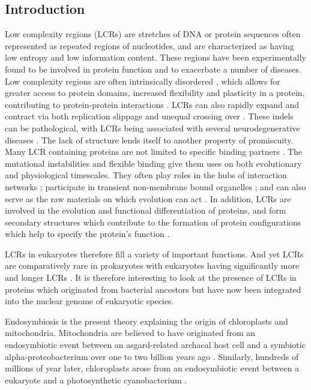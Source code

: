 \documentclass[a4paper,12pt]{article}
\begin{document}
\pagestyle{fancy}
\begin{multicols}{2}
\section*{Introduction}

Low complexity regions (LCRs) are stretches of DNA or protein
sequences often represented as repeated regions of nucleotides, and
are characterized as having low entropy and low information content.
These regions have been experimentally found to be involved in protein
function and to exacerbate a number of diseases. Low complexity regions
are often intrinsically disordered \citep{Rome:01,Dosz:06}, which
allows for greater access to protein domains, increased flexibility
and plasticity in a protein, contributing to protein-protein
interactions \citep{EnrightEtAl2023}.  LCRs can also rapidly expand
and contract via both replication slippage \citep{Hunt:06} and unequal
crossing over \citep{DePr:06}. These indels can be pathological,
with LCRs being associated with several neurodegenerative diseases
\citep{Cumm:00,Day:05,Vers:05,Muso:09}.  The lack of structure
lends itself to another property of promiscuity. Many LCR containing
proteins are not limited to specific binding partners \citep{Dosz:06,
Cole:10, Ekma:06, Fomi:21}.  The mutational instabilities and
flexible binding give them uses on both evolutionary and physiological
timescales. They often play roles in the hubs of interaction networks
\citep{Dosz:06}; participate in transient non-membrane bound organelles
\citep{Kede:02,Kato:17,Fomi:21}; and can also serve as the raw materials
on which evolution can act \citep{Rado:15,Pers:23}.  In addition,
LCRs are involved in the evolution and functional differentiation of
proteins, and form secondary structures which contribute to the formation
of protein configurations which help to specify the protein's function
\citep{Pers:23}.

LCRs in eukaryotes therefore fill a variety of important functions. And
yet LCRs are comparatively rare in prokaryotes with eukaryotes having
significantly more and longer LCRs \citep{BasileEtAl2019}.  It is
therefore interesting to look at the presence of LCRs in proteins which
originated from bacterial ancestors but have now been integrated
into the nuclear genome of eukaryotic species.

Endosymbiosis is the present theory explaining the origin of chloroplasts
and mitochondria. Mitochondria are believed to have originated from
an endosymbiotic event between an asgard-related archaeal host cell
and a symbiotic alpha-proteobacterium over one to two billion years ago
\citep{Mart:15, Step:21,Sant:25, Brav:25}. Similarly, hundreds of millions
of year later, chloroplasts arose from an endosymbiotic event between
a eukaryote and a photosynthetic cyanobacterium \citep{Mart:15,Bock:17}.


\end{multicols}
\end{document}
